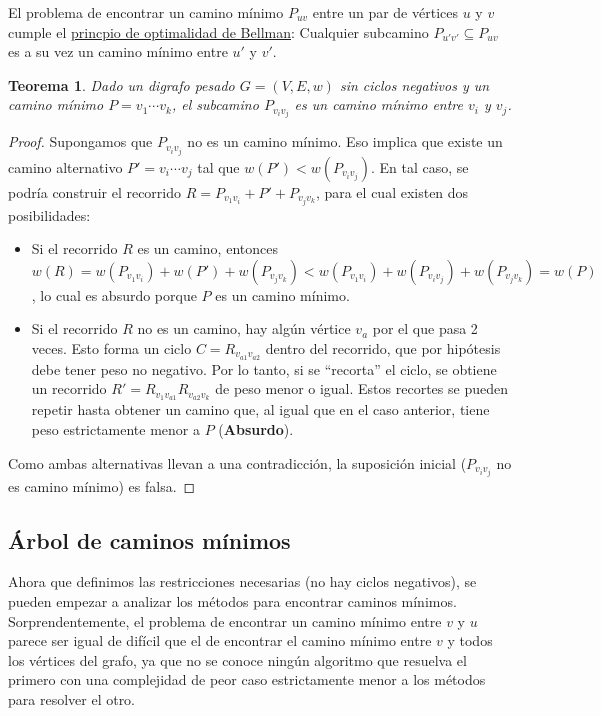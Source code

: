 \documentclass[a4paper]{report}
\newtheorem*{theorem*}{Teorema}
\begin{document}
El problema de encontrar un camino mínimo $P_{uv}$ entre un par de vértices $u$ y $v$ cumple el \hyperref[optimalidad-bellman]{princpio de optimalidad de Bellman}: Cualquier subcamino $P_{u'v'} \subseteq P_{uv}$ es a su vez un camino mínimo entre $u'$ y $v'$.
\begin{theorem*}
    Dado un digrafo pesado $G = (V, E, w)$ sin ciclos negativos y un camino mínimo $P = v_1 \cdots v_k$, el subcamino $P_{v_i v_j}$ es un camino mínimo entre $v_i$ y $v_j$.
\end{theorem*}
\begin{proof}
    Supongamos que $P_{v_i v_j}$ no es un camino mínimo. Eso implica que existe un camino alternativo $P' = v_i \cdots v_j$ tal que $w(P') < w(P_{v_i v_j})$. En tal caso, se podría construir el recorrido $R = P_{v_1 v_i} + P' + P_{v_j v_k}$, para el cual existen dos posibilidades:
    \begin{itemize}
        \item Si el recorrido $R$ es un camino, entonces $w(R) = w(P_{v_1 v_i}) + w(P') + w(P_{v_j v_k}) < w(P_{v_1 v_i}) + w(P_{v_i v_j}) + w(P_{v_j v_k}) = w(P)$, lo cual es absurdo porque $P$ es un camino mínimo.
        \item Si el recorrido $R$ no es un camino, hay algún vértice $v_a$ por el que pasa 2 veces. Esto forma un ciclo $C = R_{v_{a1} v_{a2}}$ dentro del recorrido, que por hipótesis debe tener peso no negativo. Por lo tanto, si se ``recorta'' el ciclo, se obtiene un recorrido $R' = R_{v_1 v_{a1}} R_{v_{a2} v_k}$ de peso menor o igual. Estos recortes se pueden repetir hasta obtener un camino que, al igual que en el caso anterior, tiene peso estrictamente menor a $P$ (\textbf{Absurdo}).
    \end{itemize}

    Como ambas alternativas llevan a una contradicción, la suposición inicial ($P_{v_i v_j}$ no es camino mínimo) es falsa.
\end{proof}

\subsection{Árbol de caminos mínimos}

Ahora que definimos las restricciones necesarias (no hay ciclos negativos), se pueden empezar a analizar los métodos para encontrar caminos mínimos. Sorprendentemente, el problema de encontrar un camino mínimo entre $v$ y $u$ parece ser igual de difícil que el de encontrar el camino mínimo entre $v$ y todos los vértices del grafo, ya que no se conoce ningún algoritmo que resuelva el primero con una complejidad  de peor caso estrictamente menor a los métodos para resolver el otro.
\end{document}
